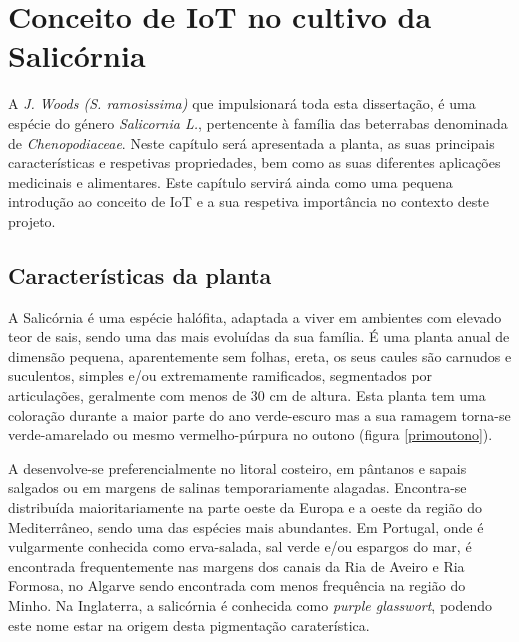 
\chapter{Conceito de IoT no cultivo da Salicórnia}

 A \sr \space \textit{J. Woods (S. ramosissima)}\cite{JoaoSilva} que impulsionará toda esta dissertação, é uma espécie do género \textit{Salicornia L.}, pertencente à família das beterrabas denominada de \textit{Chenopodiaceae}\cite{chenopodiaceae}.  Neste capítulo será apresentada a planta, as suas principais características e respetivas propriedades, bem como as suas diferentes aplicações medicinais e alimentares. Este capítulo servirá ainda como uma pequena introdução ao conceito de \ac{IoT} e a sua respetiva importância no contexto deste projeto.


\section{Características da planta}


A Salicórnia é uma espécie halófita, adaptada a viver em ambientes com elevado teor de sais\cite{ferri}, sendo uma das mais evoluídas da sua família. É uma planta anual de dimensão pequena, aparentemente sem folhas, ereta, os seus caules são carnudos e suculentos, simples e/ou extremamente ramificados, segmentados por articulações\cite{Silva2000}, geralmente com menos de 30 cm de altura\cite{overviewsal}. Esta planta tem uma coloração durante a maior parte do ano verde-escuro mas a sua ramagem torna-se  verde-amarelado ou mesmo vermelho-púrpura no outono\cite{Silva2000} (figura \ref{primoutono}).





A \sr \space desenvolve-se preferencialmente no litoral costeiro, em pântanos e sapais salgados ou em margens de salinas temporariamente alagadas. Encontra-se distribuída maioritariamente na parte oeste da Europa e a oeste da região do Mediterrâneo, sendo uma das espécies mais abundantes\cite{Figueroa1987}. Em Portugal, onde é vulgarmente conhecida como erva-salada, sal verde e/ou espargos do mar\cite{RaquelPinto}, é encontrada frequentemente nas margens dos canais da Ria de Aveiro e Ria Formosa, no Algarve\cite{RaquelPinto} sendo encontrada com menos frequência na região do Minho\cite{Silva2000}. 
Na Inglaterra, a salicórnia é conhecida como \textit{purple glasswort}, podendo este nome estar na origem desta pigmentação caraterística\cite{Davy2001}. 


